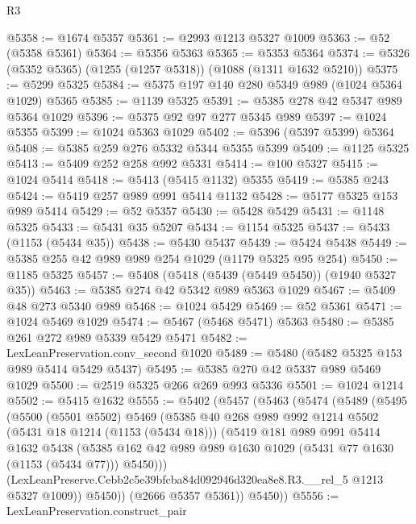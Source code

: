 \begin{lexlean}{R3}
\begin{coremodule}
@5358 := @1674 @5357
@5361 := @2993 @1213 @5327 @1009
@5363 := @52 (@5358 @5361)
@5364 := @5356 @5363
@5365 := @5353 @5364
@5374 := @5326 (@5352 @5365) (@1255 (@1257 @5318)) (@1088 (@1311 @1632 @5210))
@5375 := @5299 @5325
@5384 := @5375 @197 @140 @280 @5349 @989 (@1024 @5364 @1029) @5365
@5385 := @1139 @5325
@5391 := @5385 @278 @42 @5347 @989 @5364 @1029
@5396 := @5375 @92 @97 @277 @5345 @989
@5397 := @1024 @5355
@5399 := @1024 @5363 @1029
@5402 := @5396 (@5397 @5399) @5364
@5408 := @5385 @259 @276 @5332 @5344 @5355 @5399
@5409 := @1125 @5325
@5413 := @5409 @252 @258 @992 @5331
@5414 := @100 @5327
@5415 := @1024 @5414
@5418 := @5413 (@5415 @1132) @5355
@5419 := @5385 @243
@5424 := @5419 @257 @989 @991 @5414 @1132
@5428 := @5177 @5325 @153 @989 @5414
@5429 := @52 @5357
@5430 := @5428 @5429
@5431 := @1148 @5325
@5433 := @5431 @35 @5207
@5434 := @1154 @5325
@5437 := @5433 (@1153 (@5434 @35))
@5438 := @5430 @5437
@5439 := @5424 @5438
@5449 := @5385 @255 @42 @989 @989 @254 @1029 (@1179 @5325 @95 @254)
@5450 := @1185 @5325
@5457 := @5408 (@5418 (@5439 (@5449 @5450)) (@1940 @5327 @35))
@5463 := @5385 @274 @42 @5342 @989 @5363 @1029
@5467 := @5409 @48 @273 @5340 @989
@5468 := @1024 @5429
@5469 := @52 @5361
@5471 := @1024 @5469 @1029
@5474 := @5467 (@5468 @5471) @5363
@5480 := @5385 @261 @272 @989 @5339 @5429 @5471
@5482 := LexLeanPreservation.conv_second @1020
@5489 := @5480 (@5482 @5325 @153 @989 @5414 @5429 @5437)
@5495 := @5385 @270 @42 @5337 @989 @5469 @1029
@5500 := @2519 @5325 @266 @269 @993 @5336
@5501 := @1024 @1214
@5502 := @5415 @1632
@5555 := @5402
    (@5457
      (@5463
        (@5474
          (@5489
            (@5495
              (@5500
                (@5501 @5502)
                @5469
                (@5385
                  @40
                  @268
                  @989
                  @992
                  @1214
                  @5502
                  (@5431 @18 @1214 (@1153 (@5434 @18)))
                  (@5419
                    @181
                    @989
                    @991
                    @5414
                    @1632
                    @5438
                    (@5385
                      @162
                      @42
                      @989
                      @989
                      @1630
                      @1029
                      (@5431 @77 @1630 (@1153 (@5434 @77)))
                      @5450)))
                (LexLeanPreserve.Cebb2c5e39bfcba84d092946d320ea8e8.R3.__rel_5 @1213 @5327 @1009))
              @5450))
          (@2666 @5357 @5361))
        @5450))
@5556 := LexLeanPreservation.construct_pair

\end{coremodule}
\end{lexlean}
